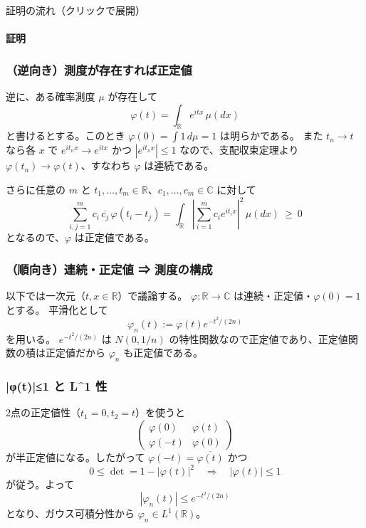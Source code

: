 \documentclass[uplatex,dvipdfmx,11pt,a4paper,openany]{bxjsbook}
\begin{document}
\begin{detailblock}{証明の流れ（クリックで展開）}
\paragraph{証明}
\subsubsection{（逆向き）測度が存在すれば正定値}
逆に、ある確率測度 $\mu$ が存在して
            \[\varphi(t)=\int_{\mathbb R} e^{itx}\,\mu(dx)\]
            と書けるとする。このとき $\varphi(0)=\int 1\,d\mu=1$ は明らかである。
            また $t_n\to t$ なら各 $x$ で $e^{it_nx}\to e^{itx}$ かつ $|e^{it_nx}|\le 1$ なので、支配収束定理より $\varphi(t_n)\to\varphi(t)$、すなわち $\varphi$ は連続である。

さらに任意の $m$ と $t_1,\dots,t_m\in\mathbb R$、$c_1,\dots,c_m\in\mathbb C$ に対して
            \[\sum_{i,j=1}^m c_i\,\overline{c_j}\,\varphi(t_i-t_j)
              =\int_{\mathbb R}\left|\sum_{i=1}^m c_i e^{it_ix}\right|^2\,\mu(dx)\ \ge\ 0\]
            となるので、$\varphi$ は正定値である。

\subsubsection{（順向き）連続・正定値 ⇒ 測度の構成}
以下では一次元（$t,x\in\mathbb R$）で議論する。
            $\varphi:\mathbb R\to\mathbb C$ は連続・正定値・$\varphi(0)=1$ とする。
            平滑化として
            \[\varphi_n(t):=\varphi(t)e^{-t^2/(2n)}\]
            を用いる。
            $e^{-t^2/(2n)}$ は $N(0,1/n)$ の特性関数なので正定値であり、正定値関数の積は正定値だから $\varphi_n$ も正定値である。

\subsubsection{|φ(t)|≤1 と L\textasciicircum{}1 性}
2点の正定値性（$t_1=0,t_2=t$）を使うと
            \[\begin{pmatrix}
                \varphi(0) & \varphi(t)\\
                \varphi(-t) & \varphi(0)
              \end{pmatrix}\]
            が半正定値になる。したがって $\varphi(-t)=\overline{\varphi(t)}$ かつ
            \[0\le \det = 1-|\varphi(t)|^2
              \quad\Rightarrow\quad
              |\varphi(t)|\le 1\]
            が従う。よって
            \[|\varphi_n(t)|\le e^{-t^2/(2n)}\]
            となり、ガウス可積分性から $\varphi_n\in L^1(\mathbb R)$。


\end{detailblock}
\end{document}
